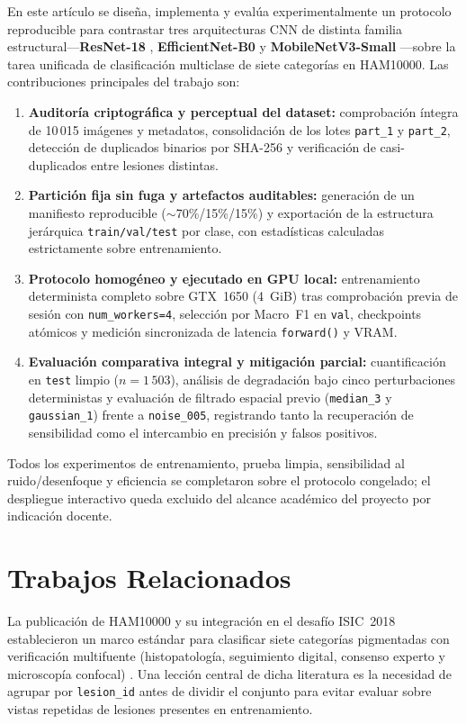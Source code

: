 \documentclass[conference]{IEEEtran}
\begin{document}
En este art\'iculo se dise\~na, implementa y eval\'ua experimentalmente un protocolo reproducible para contrastar tres arquitecturas CNN de distinta familia estructural---\textbf{ResNet-18} \cite{he2016}, \textbf{EfficientNet-B0} \cite{tan2019} y \textbf{MobileNetV3-Small} \cite{howard2019}---sobre la tarea unificada de clasificaci\'on multiclase de siete categor\'ias en HAM10000. Las contribuciones principales del trabajo son:
\begin{enumerate}
\item \textbf{Auditor\'ia criptogr\'afica y perceptual del dataset:} comprobaci\'on \'integra de 10\,015 im\'agenes y metadatos, consolidaci\'on de los lotes \texttt{part\_1} y \texttt{part\_2}, detecci\'on de duplicados binarios por SHA-256 y verificaci\'on de casi-duplicados entre lesiones distintas.
\item \textbf{Partici\'on fija sin fuga y artefactos auditables:} generaci\'on de un manifiesto reproducible ($\sim$70\%/15\%/15\%) y exportaci\'on de la estructura jer\'arquica \texttt{train/val/test} por clase, con estad\'isticas calculadas estrictamente sobre entrenamiento.
\item \textbf{Protocolo homog\'eneo y ejecutado en GPU local:} entrenamiento determinista completo sobre GTX~1650 (4~GiB) tras comprobaci\'on previa de sesi\'on con \texttt{num\_workers=4}, selecci\'on por Macro~F1 en \texttt{val}, checkpoints at\'omicos y medici\'on sincronizada de latencia \texttt{forward()} y VRAM.
\item \textbf{Evaluaci\'on comparativa integral y mitigaci\'on parcial:} cuantificaci\'on en \texttt{test} limpio ($n=1\,503$), an\'alisis de degradaci\'on bajo cinco perturbaciones deterministas y evaluaci\'on de filtrado espacial previo (\texttt{median\_3} y \texttt{gaussian\_1}) frente a \texttt{noise\_005}, registrando tanto la recuperaci\'on de sensibilidad como el intercambio en precisi\'on y falsos positivos.
\end{enumerate}

Todos los experimentos de entrenamiento, prueba limpia, sensibilidad al ruido/desenfoque y eficiencia se completaron sobre el protocolo congelado; el despliegue interactivo queda excluido del alcance acad\'emico del proyecto por indicaci\'on docente.

\section{Trabajos Relacionados}
La publicaci\'on de HAM10000 y su integraci\'on en el desaf\'io ISIC~2018 establecieron un marco est\'andar para clasificar siete categor\'ias pigmentadas con verificaci\'on multifuente (histopatolog\'ia, seguimiento digital, consenso experto y microscop\'ia confocal) \cite{tschandl2018,codella2019}. Una lecci\'on central de dicha literatura es la necesidad de agrupar por \texttt{lesion\_id} antes de dividir el conjunto para evitar evaluar sobre vistas repetidas de lesiones presentes en entrenamiento.
\end{document}
